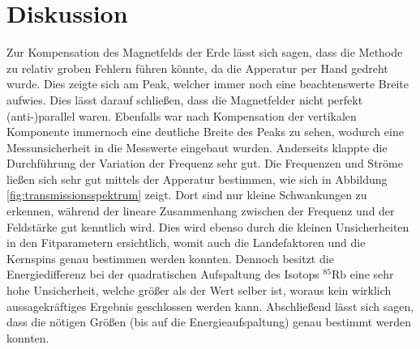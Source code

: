 \section{Diskussion}
\label{sec:Diskussion}
Zur Kompensation des Magnetfelds der Erde lässt sich sagen, dass die Methode zu relativ groben Fehlern führen könnte, 
da die Apperatur per Hand gedreht wurde.
Dies zeigte sich am Peak, welcher immer noch eine beachtenswerte Breite aufwies.
Dies lässt darauf schließen, dass die Magnetfelder nicht perfekt (anti-)parallel waren.
Ebenfalls war nach Kompensation der vertikalen Komponente immernoch eine deutliche Breite des Peaks zu sehen, wodurch eine
Messunsicherheit in die Messwerte eingebaut wurden.
Anderseits klappte die Durchführung der Variation der Frequenz sehr gut.
Die Frequenzen und Ströme ließen sich sehr gut mittels der Apperatur bestimmen, wie sich in Abbildung \ref{fig:transmissionsspektrum} zeigt.
Dort sind nur kleine Schwankungen zu erkennen, während der lineare Zusammenhang zwischen der Frequenz und der Feldstärke gut kenntlich wird.
Dies wird ebenso durch die kleinen Unsicherheiten in den Fitparametern ersichtlich, womit auch die Landefaktoren und die Kernspins 
genau bestimmen werden konnten.
Dennoch besitzt die Energiedifferenz bei der quadratischen Aufspaltung des Isotops $^{85}\text{Rb}$ eine sehr hohe Unsicherheit, welche größer 
als der Wert selber ist, woraus kein wirklich aussagekräftiges Ergebnis geschlossen werden kann.
Abschließend lässt sich sagen, dass die nötigen Größen (bis auf die Energieaufspaltung) genau bestimmt werden konnten.